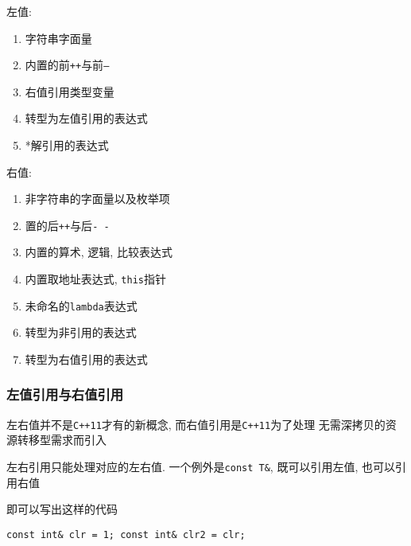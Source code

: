\begin{paracol}{2}
	\begin{leftcolumn}
		左值:
		\begin{enumerate}
			\item 字符串字面量
			\item 内置的前{\tt ++}与前{\tt --}
			\item 右值引用类型变量
			\item 转型为左值引用的表达式
			\item *解引用的表达式
		\end{enumerate}
	\end{leftcolumn}
	\begin{rightcolumn}
		右值:
		\begin{enumerate}
			\item 非字符串的字面量以及枚举项
			\item 置的后{\tt++}与后{\tt- -}
			\item 内置的算术, 逻辑, 比较表达式
			\item 内置取地址表达式, {\tt this}指针
			\item 未命名的{\tt lambda}表达式
			\item 转型为非引用的表达式
			\item 转型为右值引用的表达式
		\end{enumerate}
	\end{rightcolumn}
\end{paracol}
\subsubsection{左值引用与右值引用}

左右值并不是{\tt C++11}才有的新概念, 而右值引用是{\tt C++11}为了处理
	无需深拷贝的资源转移型需求而引入

左右引用只能处理对应的左右值. 一个例外是{\tt const T\&}, 既可以引用左值, 也可以引用右值

\noindent 即可以写出这样的代码
\begin{lstlisting}[basicstyle=\small,columns=flexible,xleftmargin=16em,xrightmargin=16em]
const int& clr = 1; const int& clr2 = clr;
\end{lstlisting}


